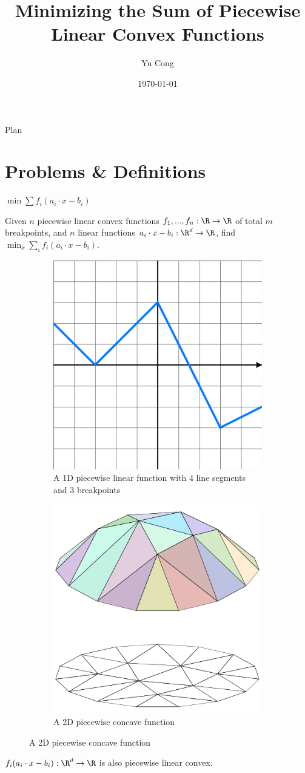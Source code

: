 \documentclass{beamer}
\author{Yu Cong}
\title[Minimizing sum of pwl convex function]{Minimizing the Sum of Piecewise Linear Convex Functions}
\date{\today}
\begin{document}
\begin{frame}[plain]
    \titlepage
\end{frame}

\begin{frame}[plain]{Plan}
    \tableofcontents
\end{frame}

\section{Problems \& Definitions}
\begin{frame}{$\min \sum f_i(a_i\cdot x-b_i)$}
\begin{problem}
    Given $n$ piecewise linear convex functions $f_1,...,f_n:\R \to \R$ of total $m$ breakpoints, and $n$ linear functions $a_i\cdot x-b_i:\R^d\to \R$, find $\min_x \sum_i f_i(a_i\cdot x-b_i)$.
\end{problem}
\begin{figure}
    \centering
    \begin{subfigure}{.5\textwidth}
      \centering
      \includegraphics[width=.4\linewidth]{images/Piecewise_linear_function.svg.png}
      \caption{A 1D piecewise linear function with 4 line segments and 3 breakpoints}
      \label{fig:sub1}
    \end{subfigure}%
    \begin{subfigure}{.5\textwidth}
      \centering
      \includegraphics[width=.4\linewidth]{images/Piecewise_linear_function2D.png}
      \caption{A 2D piecewise concave function}
      \label{fig:sub2}
    \end{subfigure}
    \label{fig:1}
    \end{figure}
    $f_i(a_i\cdot x-b_i):\R^d\to \R$ is also piecewise linear convex.
\end{frame}
\end{document}
